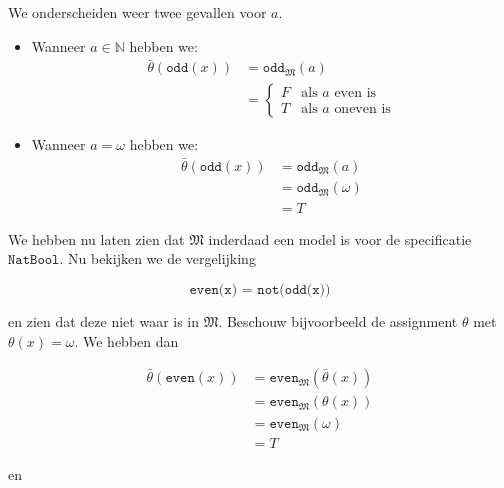 \documentclass[a4paper,11pt]{article}
\begin{document}
\begin{itemize}
We onderscheiden weer twee gevallen voor $a$.

\begin{itemize}

\item
Wanneer $a \in \mathbb{N}$ hebben we:
\begin{align*}
\bar \theta(\texttt{odd}(x)) &= \texttt{odd}_{\mathfrak{M}}(a) \\
                             &= \begin{cases}
  F & \text{als $a$ even is} \\
  T & \text{als $a$ oneven is}
\end{cases}
\end{align*}

\item
Wanneer $a = \omega$ hebben we:
\begin{align*}
\bar \theta(\texttt{odd}(x)) &= \texttt{odd}_{\mathfrak{M}}(a) \\
                             &= \texttt{odd}_{\mathfrak{M}}(\omega) \\
                             &= T
\end{align*}

\end{itemize}

\end{itemize}

We hebben nu laten zien dat $\mathfrak{M}$ inderdaad een model is voor de
specificatie $\texttt{NatBool}$. Nu bekijken we de vergelijking

\begin{displaymath}
\texttt{even(x) = not(odd(x))}
\end{displaymath}

en zien dat deze niet waar is in $\mathfrak{M}$. Beschouw bijvoorbeeld de
assignment $\theta$ met $\theta(x) = \omega$. We hebben dan

\begin{align*}
\bar \theta(\texttt{even}(x)) &= \texttt{even}_{\mathfrak{M}}(\bar \theta(x)) \\
                              &= \texttt{even}_{\mathfrak{M}}(\theta(x)) \\
                              &= \texttt{even}_{\mathfrak{M}}(\omega) \\
                              &= T
\end{align*}

en
\end{document}
